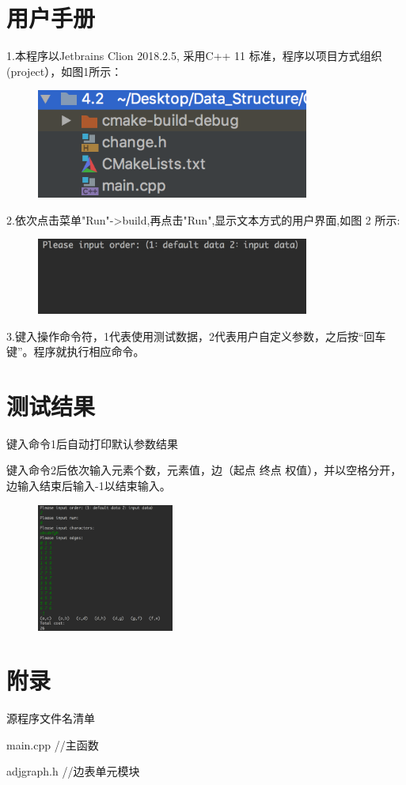 \documentclass[paper=a4,UTF8,fontsize=11pt]{scrartcl} %
\numberwithin{equation}{section} %
\numberwithin{figure}{section} %
\numberwithin{table}{section} %
\begin{document}
\section{用户手册}
1.本程序以Jetbrains Clion 2018.2.5, 采用C++ 11 标准，程序以项目方式组织(project），如图1所示：
\begin{figure}[h]
    \centering
    \includegraphics[width=0.8\textwidth]{project.png}
\end{figure}
\vspace{0.2cm}


2.依次点击菜单"Run"->build,再点击"Run",显示文本方式的用户界面,如图 2 所示:
\begin{figure}[h]
    \centering
    \includegraphics[width=0.8\textwidth]{interface.png}
\end{figure}

\newpage

3.键入操作命令符，1代表使用测试数据，2代表用户自定义参数，之后按“回车键”。程序就执行相应命令。

\section{测试结果}
键入命令1后自动打印默认参数结果

键入命令2后依次输入元素个数，元素值，边（起点 终点 权值），并以空格分开，边输入结束后输入-1以结束输入。
\begin{figure}[h]
    \centering
    \includegraphics[width=0.4\textwidth]{result.png}
\end{figure}

\section{附录}

源程序文件名清单

main.cpp                //主函数

adjgraph.h              //边表单元模块
\end{document}
